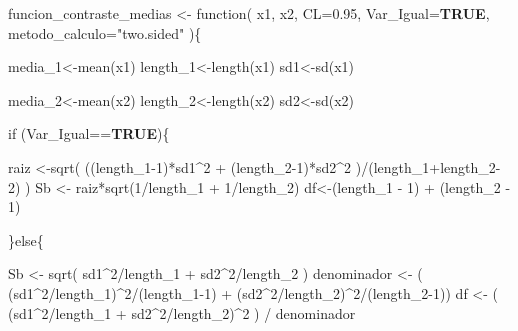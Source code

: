 \documentclass[
]{article}
\newenvironment{Shaded}{\begin{snugshade}}{\end{snugshade}}
\newcommand{\AttributeTok}[1]{\textcolor[rgb]{0.80,0.80,0.80}{#1}}
\newcommand{\ConstantTok}[1]{\textcolor[rgb]{0.86,0.64,0.64}{\textbf{#1}}}
\newcommand{\ControlFlowTok}[1]{\textcolor[rgb]{0.94,0.87,0.69}{#1}}
\newcommand{\DecValTok}[1]{\textcolor[rgb]{0.86,0.86,0.80}{#1}}
\newcommand{\FloatTok}[1]{\textcolor[rgb]{0.75,0.75,0.82}{#1}}
\newcommand{\FunctionTok}[1]{\textcolor[rgb]{0.94,0.94,0.56}{#1}}
\newcommand{\NormalTok}[1]{\textcolor[rgb]{0.80,0.80,0.80}{#1}}
\newcommand{\OtherTok}[1]{\textcolor[rgb]{0.94,0.94,0.56}{#1}}
\newcommand{\SpecialCharTok}[1]{\textcolor[rgb]{0.86,0.64,0.64}{#1}}
\newcommand{\StringTok}[1]{\textcolor[rgb]{0.80,0.58,0.58}{#1}}
\begin{document}
\begin{Shaded}
\begin{Highlighting}[]
\NormalTok{funcion\_contraste\_medias }\OtherTok{\textless{}{-}} \ControlFlowTok{function}\NormalTok{( x1, x2, }\AttributeTok{CL=}\FloatTok{0.95}\NormalTok{, }\AttributeTok{Var\_Igual=}\ConstantTok{TRUE}\NormalTok{, }\AttributeTok{metodo\_calculo=}\StringTok{"two.sided"}\NormalTok{ )\{}
  
\NormalTok{  media\_1}\OtherTok{\textless{}{-}}\FunctionTok{mean}\NormalTok{(x1)}
\NormalTok{  length\_1}\OtherTok{\textless{}{-}}\FunctionTok{length}\NormalTok{(x1)}
\NormalTok{  sd1}\OtherTok{\textless{}{-}}\FunctionTok{sd}\NormalTok{(x1)}
  
\NormalTok{  media\_2}\OtherTok{\textless{}{-}}\FunctionTok{mean}\NormalTok{(x2)}
\NormalTok{  length\_2}\OtherTok{\textless{}{-}}\FunctionTok{length}\NormalTok{(x2)}
\NormalTok{  sd2}\OtherTok{\textless{}{-}}\FunctionTok{sd}\NormalTok{(x2)}
  
  
  \ControlFlowTok{if}\NormalTok{ (Var\_Igual}\SpecialCharTok{==}\ConstantTok{TRUE}\NormalTok{)\{}
  
\NormalTok{      raiz }\OtherTok{\textless{}{-}}\FunctionTok{sqrt}\NormalTok{( ((length\_1}\DecValTok{{-}1}\NormalTok{)}\SpecialCharTok{*}\NormalTok{sd1}\SpecialCharTok{\^{}}\DecValTok{2} \SpecialCharTok{+}\NormalTok{ (length\_2}\DecValTok{{-}1}\NormalTok{)}\SpecialCharTok{*}\NormalTok{sd2}\SpecialCharTok{\^{}}\DecValTok{2}\NormalTok{ )}\SpecialCharTok{/}\NormalTok{(length\_1}\SpecialCharTok{+}\NormalTok{length\_2}\DecValTok{{-}2}\NormalTok{) )}
\NormalTok{      Sb }\OtherTok{\textless{}{-}}\NormalTok{ raiz}\SpecialCharTok{*}\FunctionTok{sqrt}\NormalTok{(}\DecValTok{1}\SpecialCharTok{/}\NormalTok{length\_1 }\SpecialCharTok{+} \DecValTok{1}\SpecialCharTok{/}\NormalTok{length\_2)}
\NormalTok{      df}\OtherTok{\textless{}{-}}\NormalTok{(length\_1 }\SpecialCharTok{{-}} \DecValTok{1}\NormalTok{) }\SpecialCharTok{+}\NormalTok{ (length\_2 }\SpecialCharTok{{-}} \DecValTok{1}\NormalTok{)}
      
\NormalTok{  \}}\ControlFlowTok{else}\NormalTok{\{}
  
\NormalTok{      Sb }\OtherTok{\textless{}{-}} \FunctionTok{sqrt}\NormalTok{( sd1}\SpecialCharTok{\^{}}\DecValTok{2}\SpecialCharTok{/}\NormalTok{length\_1 }\SpecialCharTok{+}\NormalTok{ sd2}\SpecialCharTok{\^{}}\DecValTok{2}\SpecialCharTok{/}\NormalTok{length\_2 )}
\NormalTok{      denominador }\OtherTok{\textless{}{-}}\NormalTok{ ( (sd1}\SpecialCharTok{\^{}}\DecValTok{2}\SpecialCharTok{/}\NormalTok{length\_1)}\SpecialCharTok{\^{}}\DecValTok{2}\SpecialCharTok{/}\NormalTok{(length\_1}\DecValTok{{-}1}\NormalTok{) }\SpecialCharTok{+}\NormalTok{ (sd2}\SpecialCharTok{\^{}}\DecValTok{2}\SpecialCharTok{/}\NormalTok{length\_2)}\SpecialCharTok{\^{}}\DecValTok{2}\SpecialCharTok{/}\NormalTok{(length\_2}\DecValTok{{-}1}\NormalTok{))}
\NormalTok{      df }\OtherTok{\textless{}{-}}\NormalTok{ ( (sd1}\SpecialCharTok{\^{}}\DecValTok{2}\SpecialCharTok{/}\NormalTok{length\_1 }\SpecialCharTok{+}\NormalTok{ sd2}\SpecialCharTok{\^{}}\DecValTok{2}\SpecialCharTok{/}\NormalTok{length\_2)}\SpecialCharTok{\^{}}\DecValTok{2}\NormalTok{ ) }\SpecialCharTok{/}\NormalTok{ denominador}
      

\end{Highlighting}
\end{Shaded}
\end{document}
